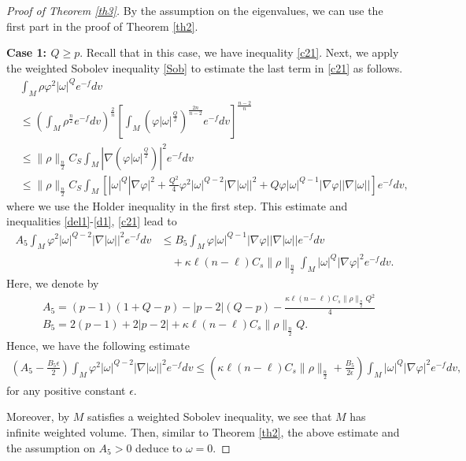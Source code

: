 \documentclass[10pt,a4paper]{amsart}
\numberwithin{equation}{section}
\begin{document}
\begin{proof}[Proof of Theorem \ref{th3}]
	By the assumption on the eigenvalues, we can use the first part in the proof of Theorem \ref{th2}.
	
	\textbf{Case 1: $Q\ge p$}. Recall that in this case, we have inequality \eqref{c21}. Next, we apply the weighted Sobolev inequality \eqref{Sob} to estimate the last term in \eqref{c21} as follows.
	\begin{align*}
		&\int_M  \rho\varphi^2  |\omega|^{Q}e^{-f}dv\\
		&\le \left(\int_M \rho^{\frac{n}{2}}e^{-f}dv\right)^{\frac{2}{n}} \left[ \int_M \left(\varphi |\omega|^{\frac{Q}{2}}\right)^{\frac{2n}{n-2}}e^{-f}dv \right]^{\frac{n-2}{n}}\\
		&\le \|\rho\|_{\frac{n}{2}} C_S  \int_M \left|\nabla\left(\varphi |\omega|^{\frac{Q}{2}}\right)\right|^2 e^{-f}dv \\
		&	\le \|\rho\|_{\frac{n}{2}} C_S \int_M \left[|\omega {|^{Q}}|\nabla \varphi {|^2}  + 
		\frac{Q^2 }{4}{\varphi ^2}|\omega|^{Q-2} |\nabla |\omega |{|^2}+ 
		Q {\varphi |\omega |^{Q-1} | \nabla \varphi| |\nabla |\omega || }\right]e^{-f}dv,
	\end{align*}
	where we use the Holder inequality in the first step. This estimate and inequalities \eqref{del1}-\eqref{d1}, \eqref{c21} lead to
	\begin{align}\nonumber
		A_5 \int_M \varphi^2 |\omega|^{Q-2}|\nabla|\omega||^2 e^{-f}dv &\le B_5 \int_M \varphi |\omega|^{Q-1} |\nabla \varphi||\nabla|\omega||e^{-f}dv\\ \nonumber
		&\quad+\kappa \ell (n-\ell) C_s \|\rho\|_{\frac{n}{2}} \int_M |\omega|^Q |\nabla \varphi|^2 e^{-f}dv.
	\end{align}
	Here, we denote by 
	\begin{align*}
		&A_5=(p-1)(1+Q-p)-|p-2|(Q-p)-\frac{\kappa \ell (n-\ell)C_s \|\rho\|_{\frac{n}{2}} Q^2}{4}\\
		&B_5=2(p-1)+2|p-2|+\kappa \ell (n-\ell)C_s \|\rho\|_{\frac{n}{2}} Q.
	\end{align*}
	Hence, we have the following estimate
		\begin{align} \nonumber
		\left(A_5-\frac{B_5 \epsilon}{2}\right) \int_M \varphi^2 |\omega|^{Q-2}|\nabla|\omega||^2 e^{-f}dv \le \left(\kappa \ell (n-\ell)C_s \|\rho\|_{\frac{n}{2}}+\frac{B_5 }{2\epsilon} \right) \int_M |\omega|^Q |\nabla \varphi|^2 e^{-f}dv,
	\end{align}
	for any positive constant $\epsilon$.
	
	Moreover, by $M$ satisfies a weighted Sobolev inequality, we see that $M$ has infinite weighted volume. Then, similar to Theorem \ref{th2}, the above estimate and the assumption on $A_5>0$ deduce to $\omega=0$.
	

\end{proof}
\end{document}

